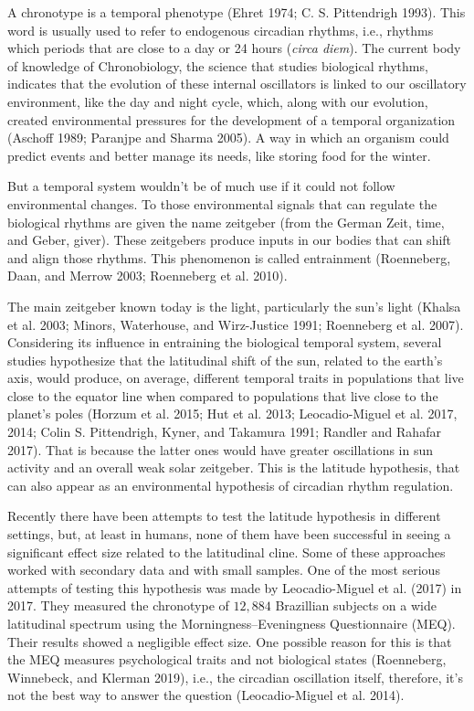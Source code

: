 \documentclass[
  12pt,
  a4paper,
  oneside]{tesesusp}
\begin{document}
A chronotype is a temporal phenotype (Ehret 1974; C. S. Pittendrigh
1993). This word is usually used to refer to endogenous circadian
rhythms, i.e., rhythms which periods that are close to a day or 24 hours
(\emph{circa diem}). The current body of knowledge of Chronobiology, the
science that studies biological rhythms, indicates that the evolution of
these internal oscillators is linked to our oscillatory environment,
like the day and night cycle, which, along with our evolution, created
environmental pressures for the development of a temporal organization
(Aschoff 1989; Paranjpe and Sharma 2005). A way in which an organism
could predict events and better manage its needs, like storing food for
the winter.

But a temporal system wouldn't be of much use if it could not follow
environmental changes. To those environmental signals that can regulate
the biological rhythms are given the name zeitgeber (from the German
Zeit, time, and Geber, giver). These zeitgebers produce inputs in our
bodies that can shift and align those rhythms. This phenomenon is called
entrainment (Roenneberg, Daan, and Merrow 2003; Roenneberg et al. 2010).

The main zeitgeber known today is the light, particularly the sun's
light (Khalsa et al. 2003; Minors, Waterhouse, and Wirz-Justice 1991;
Roenneberg et al. 2007). Considering its influence in entraining the
biological temporal system, several studies hypothesize that the
latitudinal shift of the sun, related to the earth's axis, would
produce, on average, different temporal traits in populations that live
close to the equator line when compared to populations that live close
to the planet's poles (Horzum et al. 2015; Hut et al. 2013;
Leocadio-Miguel et al. 2017, 2014; Colin S. Pittendrigh, Kyner, and
Takamura 1991; Randler and Rahafar 2017). That is because the latter
ones would have greater oscillations in sun activity and an overall weak
solar zeitgeber. This is the latitude hypothesis, that can also appear
as an environmental hypothesis of circadian rhythm regulation.

Recently there have been attempts to test the latitude hypothesis in
different settings, but, at least in humans, none of them have been
successful in seeing a significant effect size related to the
latitudinal cline. Some of these approaches worked with secondary data
and with small samples. One of the most serious attempts of testing this
hypothesis was made by Leocadio-Miguel et al. (2017) in 2017. They
measured the chronotype of \(12,884\) Brazillian subjects on a wide
latitudinal spectrum using the Morningness--Eveningness Questionnaire
(MEQ). Their results showed a negligible effect size. One possible
reason for this is that the MEQ measures psychological traits and not
biological states (Roenneberg, Winnebeck, and Klerman 2019), i.e., the
circadian oscillation itself, therefore, it's not the best way to answer
the question (Leocadio-Miguel et al. 2014).
\end{document}
